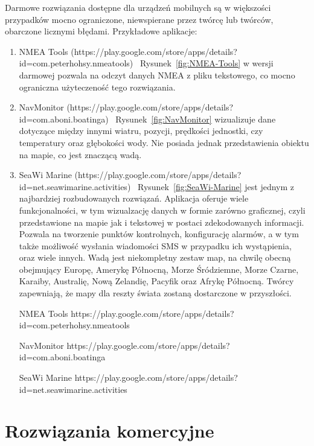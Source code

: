 \documentclass[skorowidz,skroty]{dyplomWEZUT}
\begin{document}
Darmowe rozwiązania dostępne dla urządzeń mobilnych są w większości przypadków mocno ograniczone, niewspierane przez twórcę lub twórców, obarczone licznymi błędami. Przykładowe aplikacje:
\begin{enumerate}

\item NMEA Tools (https://play.google.com/store/apps/details?id=com.peterhohsy.nmeatools) ~Rysunek~\ref{fig:NMEA-Tools} w wersji darmowej pozwala na odczyt danych NMEA z pliku tekstowego, co mocno ograniczna użyteczeność tego rozwiązania. 

\item NavMonitor (https://play.google.com/store/apps/details?id=com.aboni.boatinga)  ~Rysunek~\ref{fig:NavMonitor} wizualizuje dane dotyczące między innymi wiatru, pozycji, prędkości jednostki, czy temperatury oraz głębokości wody. Nie posiada jednak przedstawienia obiektu na mapie, co jest znaczącą wadą. 

\item SeaWi Marine (https://play.google.com/store/apps/details?id=net.seawimarine.activities) ~Rysunek~\ref{fig:SeaWi-Marine} jest jednym z najbardziej rozbudowanych rozwiązań. Aplikacja oferuje wiele funkcjonalności, w tym wizualzację danych w formie zarówno graficznej, czyli przedstawione na mapie jak i tekstowej w postaci zdekodowanych informacji. Pozwala na tworzenie punktów kontrolnych, konfigurację alarmów, a w tym także możliwość wysłania wiadomości SMS w przypadku ich wystąpienia, oraz wiele innych. Wadą jest niekompletny zestaw map, na chwilę obecną obejmujący Europę, Amerykę Północną, Morze Śródziemne, Morze Czarne, Karaiby, Australię, Nową Zelandię, Pacyfik oraz Afrykę Północną. Twórcy zapewniają, że mapy dla reszty świata zostaną dostarczone w przyszłości.

{NMEA Tools \label{fig:NMEA-Tools}}
{https://play.google.com/store/apps/details?id=com.peterhohsy.nmeatools}

{NavMonitor \label{fig:NavMonitor}}
{https://play.google.com/store/apps/details?id=com.aboni.boatinga}

{SeaWi Marine \label{fig:SeaWi-Marine}}
{https://play.google.com/store/apps/details?id=net.seawimarine.activities}

\end{enumerate}

\section{Rozwiązania komercyjne}\label{chap: Commercial solutions}
\end{document}
